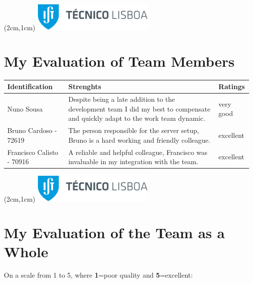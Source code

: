 \documentclass[12pt,a4paper]{article}
\begin{document}
\textblockorigin{-18pt}{-2pt}
\begin{textblock*}{10cm}(2cm,1cm)
\includegraphics[width=6cm]{IST_C_RGB_POS-01-CROP.jpg}
\end{textblock*}

\section{My Evaluation of Team Members}          
\begin{table}[htp]
\footnotesize
\centering
\begin{tabulary}{\linewidth}{|L|L|l|}
\hline
{}Identification & Strenghts & Ratings \\
\hline
Nuno Sousa & Despite being a late addition to the development team I did my best to compensate and quickly adapt to the work team dynamic.& very good \\
\hline
Bruno Cardoso - 72619 &  The person responsible for the server setup, Bruno is a hard working and friendly colleague.& excellent \\
\hline
Francisco Calisto - 70916 & A reliable and helpful colleague, Francisco was invaluable in my integration with the team.& excellent \\
\hline



\end{tabulary}
\label{tab:team}
\end{table}%
\newpage 
\textblockorigin{-18pt}{-2pt}
\begin{textblock*}{10cm}(2cm,1cm)
\includegraphics[width=6cm]{IST_C_RGB_POS-01-CROP.jpg}
\end{textblock*}
\section{My Evaluation of the Team as a Whole} 
On a scale from 1 to 5, where \textbf{1}=poor quality and \textbf{5}=excellent:
\end{document}
